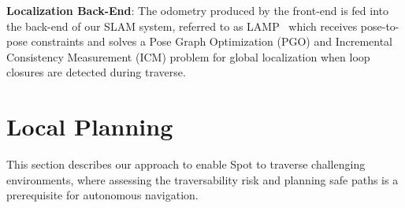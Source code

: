 \documentclass[letterpaper, 10pt, conference]{ieeeconf}      %
\newcommand{\ph}[1]{{\textbf{#1}:}} %
\newcommand{\rev}[1]{{\color{blue}#1}} %
\begin{document}

\ph{Localization Back-End} The odometry produced by the front-end is fed into the back-end of our SLAM system, referred to as LAMP~\cite{Ebadi2020} which receives pose-to-pose constraints and solves a Pose Graph Optimization (PGO) and Incremental Consistency Measurement (ICM) problem for global localization when loop closures are detected during traverse.



\section{Local Planning}\label{sec:local_planning}
This section describes our approach to enable Spot to traverse challenging environments, where assessing the traversability risk and planning safe paths is a prerequisite for autonomous navigation.


\end{document}
